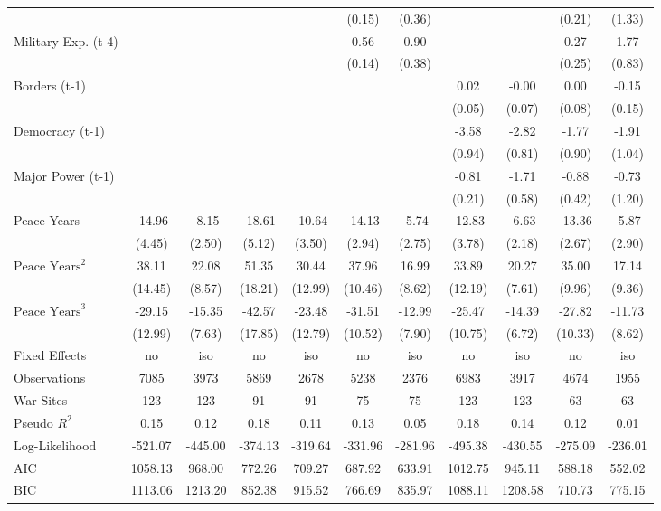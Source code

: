 \begin{tabular}{lcccccccccc}
&  &  &  &  & (0.15) & (0.36) &  &  & (0.21) & (1.33) \\
Military Exp. (t-4) &  &  &  &  & 0.56 & 0.90 &  &  & 0.27 & 1.77 \\
&  &  &  &  & (0.14) & (0.38) &  &  & (0.25) & (0.83) \\
Borders (t-1) &  &  &  &  &  &  & 0.02 & -0.00 & 0.00 & -0.15 \\
&  &  &  &  &  &  & (0.05) & (0.07) & (0.08) & (0.15) \\
Democracy (t-1) &  &  &  &  &  &  & -3.58 & -2.82 & -1.77 & -1.91 \\
&  &  &  &  &  &  & (0.94) & (0.81) & (0.90) & (1.04) \\
Major Power (t-1) &  &  &  &  &  &  & -0.81 & -1.71 & -0.88 & -0.73 \\
&  &  &  &  &  &  & (0.21) & (0.58) & (0.42) & (1.20) \\
Peace Years & -14.96 & -8.15 & -18.61 & -10.64 & -14.13 & -5.74 & -12.83 & -6.63 & -13.36 & -5.87 \\
& (4.45) & (2.50) & (5.12) & (3.50) & (2.94) & (2.75) & (3.78) & (2.18) & (2.67) & (2.90) \\
$\text{Peace Years}^2$ & 38.11 & 22.08 & 51.35 & 30.44 & 37.96 & 16.99 & 33.89 & 20.27 & 35.00 & 17.14 \\
& (14.45) & (8.57) & (18.21) & (12.99) & (10.46) & (8.62) & (12.19) & (7.61) & (9.96) & (9.36) \\
$\text{Peace Years}^3$ & -29.15 & -15.35 & -42.57 & -23.48 & -31.51 & -12.99 & -25.47 & -14.39 & -27.82 & -11.73 \\
& (12.99) & (7.63) & (17.85) & (12.79) & (10.52) & (7.90) & (10.75) & (6.72) & (10.33) & (8.62) \\
\midrule
Fixed Effects & no & iso & no & iso & no & iso & no & iso & no & iso \\
Observations & 7085 & 3973 & 5869 & 2678 & 5238 & 2376 & 6983 & 3917 & 4674 & 1955 \\
War Sites & 123 & 123 & 91 & 91 & 75 & 75 & 123 & 123 & 63 & 63 \\
Pseudo $R^2$ & 0.15 & 0.12 & 0.18 & 0.11 & 0.13 & 0.05 & 0.18 & 0.14 & 0.12 & 0.01 \\
Log-Likelihood & -521.07 & -445.00 & -374.13 & -319.64 & -331.96 & -281.96 & -495.38 & -430.55 & -275.09 & -236.01 \\
AIC & 1058.13 & 968.00 & 772.26 & 709.27 & 687.92 & 633.91 & 1012.75 & 945.11 & 588.18 & 552.02 \\
BIC & 1113.06 & 1213.20 & 852.38 & 915.52 & 766.69 & 835.97 & 1088.11 & 1208.58 & 710.73 & 775.15 \\
\bottomrule
\end{tabular}
